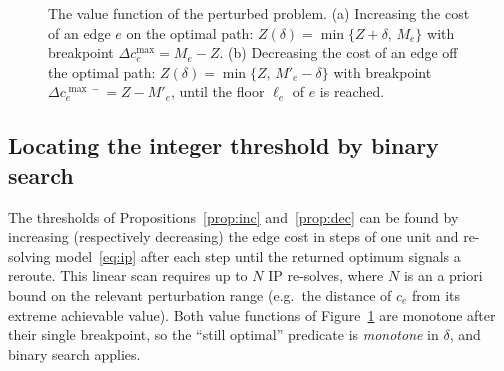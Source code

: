 \documentclass[10pt,twocolumn]{article}
\begin{document}
\begin{figure}[t]
\centering
{}
\caption{The value function of the perturbed problem. (a) Increasing the cost of an edge
$e$ on the optimal path: $Z(\delta)=\min\{Z+\delta,\,M_e\}$ with breakpoint
$\Delta c^{\max}_e=M_e-Z$. (b) Decreasing the cost of an edge off the optimal path:
$Z(\delta)=\min\{Z,\,M'_e-\delta\}$ with breakpoint $\Delta c^{\max\!-}_e=Z-M'_e$, until the
floor $\ell_e$ of $e$ is reached.}
\label{fig:vf}
\end{figure}

\subsection{Locating the integer threshold by binary search}

The thresholds of Propositions~\ref{prop:inc} and~\ref{prop:dec} can be found by increasing
(respectively decreasing) the edge cost in steps of one unit and re-solving
model~\eqref{eq:ip} after each step until the returned optimum signals a reroute. This
linear scan requires up to $N$ IP re-solves, where $N$ is an a priori bound on the relevant
perturbation range (e.g.\ the distance of $c_e$ from its extreme achievable value). Both
value functions of Figure~\ref{fig:vf} are monotone after their single breakpoint, so the
``still optimal'' predicate is \emph{monotone} in $\delta$, and binary search applies.
\end{document}
